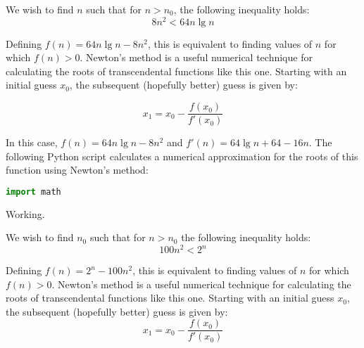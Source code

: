 \documentclass[a4paper,12pt]{article}
\begin{document}

We wish to find $n$ such that for $n > n_0$, the following inequality holds:
\[ 8n^2 < 64n \lg n\]

Defining $f(n) = 64n \lg n - 8n^2$, this is equivalent to finding values of $n$ for which 
$f(n) > 0$. Newton's method is a useful numerical technique for calculating the roots 
of transcendental functions like this one. Starting with an initial guess $x_0$, the 
subsequent (hopefully better) guess is given by:

\[ x_1 = x_0 - \frac{f(x_0)}{f'(x_0)} \]

In this case, $f(n) = 64n \lg n - 8n^2$ and $f'(n) = 64\lg n + 64- 16n$. The following Python script calculates a numerical 
approximation for the roots of this function using Newton's method:

\begin{lstlisting}[language=Python]
import math

\end{lstlisting}

Working.

\vspace{5mm}


We wish to find $n_0$ such that for $n > n_0$ the following inequality holds:
\[ 100n^2 < 2^n \]

Defining $f(n) = 2^n - 100n^2$, this is equivalent to finding values of $n$ for which $f(n) > 0$.
Newton's method is a useful numerical technique for calculating the roots of transcendental functions like this one.
Starting with an initial guess $x_0$, the subsequent (hopefully better) guess is given by:
\[ x_1 = x_0 - \frac{f(x_0)}{f'(x_0)} \]
\end{document}
